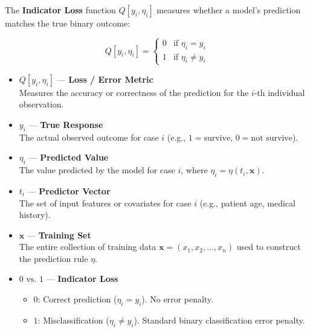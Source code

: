 \documentclass[
  letterpaper,
  DIV=11,
  numbers=noendperiod]{scrreprt}
\providecommand{\tightlist}{%
  \setlength{\itemsep}{0pt}\setlength{\parskip}{0pt}}
\begin{document}
\begin{tcolorbox}[enhanced jigsaw, arc=.35mm, bottomrule=.15mm, bottomtitle=1mm, breakable, colback=white, colbacktitle=quarto-callout-note-color!10!white, colframe=quarto-callout-note-color-frame, coltitle=black, left=2mm, leftrule=.75mm, opacityback=0, opacitybacktitle=0.6, rightrule=.15mm, title=\textcolor{quarto-callout-note-color}{\faInfo}\hspace{0.5em}{Definition: Indicator Loss}, titlerule=0mm, toprule=.15mm, toptitle=1mm]

The \textbf{Indicator Loss} function \(Q[y_i, \eta_i]\) measures whether
a model's prediction matches the true binary outcome:

\[
Q[y_i, \eta_i] = \begin{cases} 
0 & \text{if } \eta_i = y_i \\ 
1 & \text{if } \eta_i \neq y_i 
\end{cases}
\]

\begin{itemize}
\item
  \textbf{\(Q[y_i, \eta_i]\)} --- \textbf{Loss / Error Metric}\\
  Measures the accuracy or correctness of the prediction for the
  \(i\)-th individual observation.
\item
  \textbf{\(y_i\)} --- \textbf{True Response}\\
  The actual observed outcome for case \(i\) (e.g.,
  \(1 = \text{survive}\), \(0 = \text{not survive}\)).
\item
  \textbf{\(\eta_i\)} --- \textbf{Predicted Value}\\
  The value predicted by the model for case \(i\), where
  \(\eta_i = \eta(t_i, \mathbf{x})\).
\item
  \textbf{\(t_i\)} --- \textbf{Predictor Vector}\\
  The set of input features or covariates for case \(i\) (e.g., patient
  age, medical history).
\item
  \textbf{\(\mathbf{x}\)} --- \textbf{Training Set}\\
  The entire collection of training data
  \(\mathbf{x} = (x_1, x_2, \dots, x_n)\) used to construct the
  prediction rule \(\eta\).
\item
  \textbf{\(0 \text{ vs. } 1\)} --- \textbf{Indicator Loss}

  \begin{itemize}
  \tightlist
  \item
    \textbf{\(0\)}: Correct prediction (\(\eta_i = y_i\)). No error
    penalty.\\
  \item
    \textbf{\(1\)}: Misclassification (\(\eta_i \neq y_i\)). Standard
    binary classification error penalty.
  \end{itemize}
\end{itemize}

\end{tcolorbox}
\end{document}

